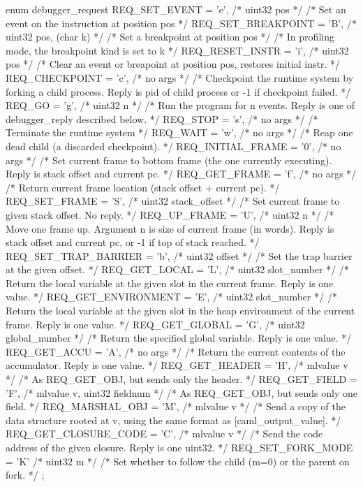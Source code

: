 \documentclass[11pt,a4paper]{report}
\begin{document}
\begin{C}

enum debugger_request {
  REQ_SET_EVENT = 'e',          /* uint32 pos */
  /* Set an event on the instruction at position pos */
  REQ_SET_BREAKPOINT = 'B',     /* uint32 pos, (char k) */
  /* Set a breakpoint at position pos */
  /* In profiling mode, the breakpoint kind is set to k */
  REQ_RESET_INSTR = 'i',        /* uint32 pos */
  /* Clear an event or breapoint at position pos, restores initial instr. */
  REQ_CHECKPOINT = 'c',         /* no args */
  /* Checkpoint the runtime system by forking a child process.
     Reply is pid of child process or -1 if checkpoint failed. */
  REQ_GO = 'g',                 /* uint32 n */
  /* Run the program for n events.
     Reply is one of debugger_reply described below. */
  REQ_STOP = 's',               /* no args */
  /* Terminate the runtime system */
  REQ_WAIT = 'w',               /* no args */
  /* Reap one dead child (a discarded checkpoint). */
  REQ_INITIAL_FRAME = '0',      /* no args */
  /* Set current frame to bottom frame (the one currently executing).
     Reply is stack offset and current pc. */
  REQ_GET_FRAME = 'f',          /* no args */
  /* Return current frame location (stack offset + current pc). */
  REQ_SET_FRAME = 'S',          /* uint32 stack_offset */
  /* Set current frame to given stack offset. No reply. */
  REQ_UP_FRAME = 'U',           /* uint32 n */
  /* Move one frame up. Argument n is size of current frame (in words).
     Reply is stack offset and current pc, or -1 if top of stack reached. */
  REQ_SET_TRAP_BARRIER = 'b',   /* uint32 offset */
  /* Set the trap barrier at the given offset. */
  REQ_GET_LOCAL = 'L',          /* uint32 slot_number */
  /* Return the local variable at the given slot in the current frame.
     Reply is one value. */
  REQ_GET_ENVIRONMENT = 'E',    /* uint32 slot_number */
  /* Return the local variable at the given slot in the heap environment
     of the current frame. Reply is one value. */
  REQ_GET_GLOBAL = 'G',         /* uint32 global_number */
  /* Return the specified global variable. Reply is one value. */
  REQ_GET_ACCU = 'A',           /* no args */
  /* Return the current contents of the accumulator. Reply is one value. */
  REQ_GET_HEADER = 'H',         /* mlvalue v */
  /* As REQ_GET_OBJ, but sends only the header. */
  REQ_GET_FIELD = 'F',          /* mlvalue v, uint32 fieldnum */
  /* As REQ_GET_OBJ, but sends only one field. */
  REQ_MARSHAL_OBJ = 'M',        /* mlvalue v */
  /* Send a copy of the data structure rooted at v, using the same
     format as [caml_output_value]. */
  REQ_GET_CLOSURE_CODE = 'C',   /* mlvalue v */
  /* Send the code address of the given closure.
     Reply is one uint32. */
  REQ_SET_FORK_MODE = 'K'       /* uint32 m */
  /* Set whether to follow the child (m=0) or the parent on fork. */
};

\end{C}
\end{document}
